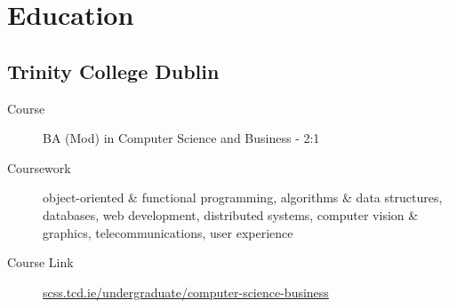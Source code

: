 \section*{Education}

\subsection*{Trinity College Dublin}
\begin{description}
  \item[Course] BA (Mod) in Computer Science and Business - 2:1
  \item[Coursework] object-oriented \& functional programming, algorithms \& data structures, databases, web development, distributed systems, computer vision \& graphics, telecommunications, user experience
  \item[Course Link] \href{https://www.scss.tcd.ie/undergraduate/computer-science-business/}{scss.tcd.ie/undergraduate/computer-science-business}
\end{description}
